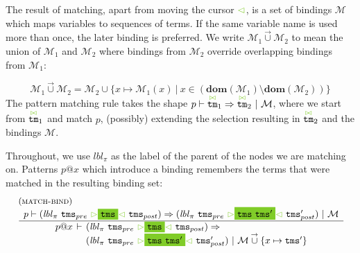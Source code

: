 \documentclass{article}
\makeatletter
\newcommand{\rulename}{\textsc}
\newcommand{\irule}[3]{\begin{array}{l}{~\small\mbox{(\rulename{#1})}}\\\;\frac{\begin{array}{c}#2\end{array}}{\begin{array}{l}#3\end{array}}\end{array}}
\newcommand{\cursorColor}{LimeGreen}
\newcommand{\lbl}{\ensuremath{\mathit{lbl}}}
\newcommand{\tm}{\ensuremath{\mathtt{tm}}}
\newcommand{\tms}{\ensuremath{\mathtt{tms}}}
\newcommand{\Tmc}{\ensuremath{\overset{ \textcolor{\cursorColor}{\bowtie}}{\tm}}}
\newcommand{\mstart}{\ensuremath{\textcolor{\cursorColor}{\rhd}}}
\newcommand{\mend}{\ensuremath{\textcolor{\cursorColor}{\lhd}}}
\newcommand{\bindings}{\ensuremath{\mathcal{M}}}
\newcommand{\extend}[2]{\ensuremath{#1\overset{\rightarrow}{\cup}#2}}
\newcommand{\select}[1]{\mstart\colorbox{\cursorColor}{$#1$}\mend}
\newcommand{\matches}[4]{\ensuremath{#1 \vdash #2 \Rightarrow #3 ~|~ #4}}
\newcommand{\xmatches}[4]{\ensuremath{
    \begin{array}{r@{\hspace{4pt}}c@{\hspace{4pt}}l}%
      #1 & \vdash & #2 \Rightarrow\\
         &        & #3 ~|~ #4
    \end{array}}}
\newcommand{\any}{\ensuremath{\text{\underline{\hspace{0.6em}}}}}
\newcommand{\bind}[2]{\ensuremath{#1@#2}}
\makeatother
\begin{document}
The result of matching, apart from moving the cursor $\mend$, is a
set of bindings $\bindings$ which maps variables to sequences of
terms.
%
If the same variable name is used more than once, the later
binding is preferred. We write $\extend{\bindings_1}{\bindings_2}$
to mean the union of $\bindings_1$ and $\bindings_2$ where
bindings from $\bindings_2$ override overlapping bindings from
$\bindings_1$:

\[
    \extend{\bindings_1}{\bindings_2} = \bindings_2\cup \{x\mapsto \bindings_1(x) ~|~ x \in (\mathbf{dom}(\bindings_1)\setminus\mathbf{dom}(\bindings_2))\}
\]
%
The pattern matching rule takes the shape
$\matches{p}{\Tmc_1}{\Tmc_2}{\bindings}$, where we start from
$\Tmc_1$ and match $p$, (possibly) extending the selection
resulting in $\Tmc_2$ and the bindings $\bindings$.

Throughout, we use $\lbl_\pi$ as the label of the parent of the
nodes we are matching on.
%
Patterns $\bind{p}{x}$ which introduce a binding remembers the
terms that were matched in the resulting binding set:
%
\[
  \begin{array}{c}
    \irule{match-bind}{
    \matches{p}{(\lbl_\pi~\tms_{pre}~\select{\tms}~\tms_{post})}
               {(\lbl_\pi~\tms_{pre}~\select{\tms~\tms'}~\tms'_{post})}{\bindings}
    }{
    \xmatches{\bind{p}{x}}
    {(\lbl_\pi~\tms_{pre}~\select{\tms}~\tms_{post})}
    {(\lbl_\pi~\tms_{pre}~\select{\tms~\tms'}~\tms'_{post})}{\extend{\bindings} \{x\mapsto\tms'\}}
    }
  \end{array}
\]
%
\end{document}
